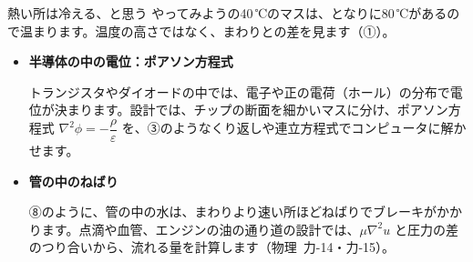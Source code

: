 \begin{tsumazuki}{熱い所は冷える、と思う}
やってみようの40\,℃のマスは、となりに80\,℃があるので温まります。温度の高さではなく、まわりとの差を見ます（①）。
\end{tsumazuki}

\begin{butsuri}
\begin{itemize}[leftmargin=1.2\zw, itemsep=3pt, topsep=0pt, label={\color{\bkTT}●}]
\item \textbf{半導体の中の電位：ポアソン方程式}\par\vspace{2pt}\noindent\begin{minipage}[c]{0.74\linewidth}\raggedright
トランジスタやダイオードの中では、電子や正の電荷（ホール）の分布で電位が決まります。設計では、チップの断面を細かいマスに分け、ポアソン方程式 $\nabla^2\phi=-\dfrac{\rho}{\varepsilon}$ を、③のようなくり返しや連立方程式でコンピュータに解かせます。
\end{minipage}\hfill
\begin{minipage}[c]{0.22\linewidth}\centering
{}
\end{minipage}
\item \textbf{管の中のねばり}\par\vspace{2pt}\noindent\begin{minipage}[c]{0.74\linewidth}\raggedright
⑧のように、管の中の水は、まわりより速い所ほどねばりでブレーキがかかります。点滴や血管、エンジンの油の通り道の設計では、$\mu\nabla^2u$ と圧力の差のつり合いから、流れる量を計算します\mbox{（物理 力-14・力-15）}。
\end{minipage}\hfill
\begin{minipage}[c]{0.22\linewidth}\centering
{}
\end{minipage}
\end{itemize}
\end{butsuri}

